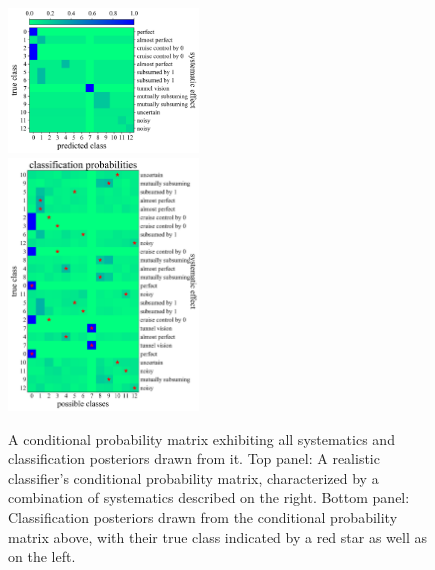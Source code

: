 \begin{figure}
\begin{center}
{%
		\label{fig:mock_cm}}
	\end{center}
\end{figure}

\begin{figure}
	\begin{center}
		\includegraphics[width=0.45\textwidth]{./fig/combined.png}\\
    \includegraphics[width=0.45\textwidth]{./fig/examples.png}
		\caption{A conditional probability matrix exhibiting all systematics and classification posteriors drawn from it.
		Top panel: A realistic classifier's conditional probability matrix, characterized by a combination of systematics described on the right.
		Bottom panel: Classification posteriors drawn from the conditional probability matrix above, with their true class indicated by a red star as well as on the left.
		}
		\label{fig:mock_probs}
	\end{center}
\end{figure}

